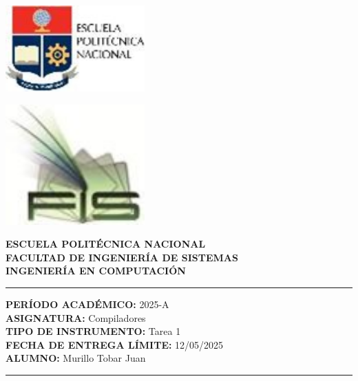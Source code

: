 \documentclass[12pt]{article}
\begin{document}
\begin{minipage}{0.45\textwidth}
    \includegraphics[width=0.4\textwidth]{inFiles/Figures/epnLogo.jpg}
\end{minipage}
\hfill
\begin{minipage}{0.45\textwidth}
    \raggedleft
    \includegraphics[width=0.4\textwidth]{inFiles/Figures/FIS_logo.jpg}
\end{minipage}

\vspace{0.5cm}

\begin{center}
    \textbf{ESCUELA POLITÉCNICA NACIONAL}\\[0.2cm]
    \textbf{FACULTAD DE INGENIERÍA DE SISTEMAS}\\[0.2cm]
    \textbf{INGENIERÍA {\textbf{EN COMPUTACIÓN}}}
\end{center}

\vspace{0.5cm}
\hrule
\vspace{0.5cm}

\noindent\textbf{PERÍODO ACADÉMICO:} 2025-A\\[0.2cm]
\noindent\textbf{ASIGNATURA:} Compiladores\\[0.2cm]
\noindent\textbf{TIPO DE INSTRUMENTO:} Tarea 1\\[0.2cm]
\noindent\textbf{FECHA DE ENTREGA LÍMITE:} 12/05/2025\\[0.2cm]
\noindent\textbf{ALUMNO:} Murillo Tobar Juan

\vspace{0.5cm}
\hrule
\vspace{1cm}
\end{document}
